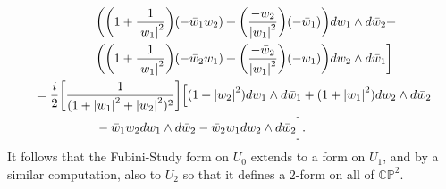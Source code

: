 \documentclass[11pt,leqno]{article}
\theoremstyle{plain}
\theoremstyle{definition}
\numberwithin{equation}{section}
\numberwithin{lem}{section}
\begin{document}
\begin{enumerate}
\begin{align*}
        &\hspace{5em}\bigg(\bigg(1+\frac{1}{\abs{w_1}^2}\bigg)(-\bar w_1w_2) + \bigg(\frac{-w_2}{\abs{w_1}^2}\bigg)(-\bar w_1)\bigg)dw_1\wedge d\bar w_2 +\\
        &\hspace{5em}\bigg(\bigg(1+\frac{1}{\abs{w_1}^2}\bigg)(-\bar w_2w_1) + \bigg(\frac{-\bar w_2}{\abs{w_1}^2}\bigg)(-w_1)\bigg)dw_2\wedge d\bar w_1\bigg]\\
        &= \frac{i}{2}\bigg[\frac{1}{(1+\abs{w_1}^2+\abs{w_2}^2)^2}\bigg]\Big[(1+\abs{w_2}^2)dw_1\wedge d\bar w_1 + (1+\abs{w_1}^2)dw_2\wedge d\bar w_2\\
        &\hspace{5em} - \bar w_1w_2dw_1\wedge d\bar w_2 - \bar w_2w_1dw_2\wedge d\bar w_2\Big].
    \end{align*}
    It follows that the Fubini-Study form on $U_0$ extends to a form on $U_1$, and by a similar computation, also to $U_2$ so that it defines a $2$-form on all of $\mathbb{CP}^2$.

\end{enumerate}
\end{document}
